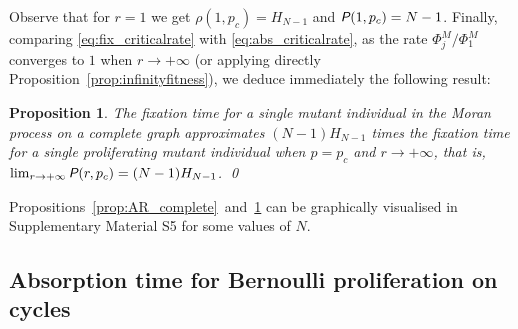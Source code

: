 \documentclass[a4paper,english,10pt]{amsart}
\newcommand{\Rho}{\emph{\textsf{P\hspace{0.1ex}}}}
\newtheorem{proposition}{\bf Proposition}[section]
\theoremstyle{definition}
\numberwithin{equation}{section}
\begin{document}
Observe that for $r=1$ we get  $\rho(1,p_c) = H_{N-1}$ and $\Rho(1,p_c)= N-1$. Finally, comparing \eqref{eq:fix_criticalrate} with \eqref{eq:abs_criticalrate}, as the rate $\Phi^M_j/\Phi^M_1$ converges to $1$ when $r \to +\infty$ (or applying directly Proposition~\ref{prop:infinityfitness}), we deduce immediately the following result:

\begin{proposition}  \label{prop:FR_complete}
The fixation time for a single mutant individual in the Moran process on a complete graph approximates $(N-1)H_{N-1}$ times the fixation time for a single proliferating mutant individual when $p=p_c$ and $r \to +\infty$, that is, 
$\lim_{r \to +\infty} \Rho(r,p_c)  = (N-1)H_{N-1}$. \qed
\end{proposition}

\noindent
Propositions~\ref{prop:AR_complete}~and~\ref{prop:FR_complete} can be graphically visualised in Supplementary Material S5 for some values of $N$.


\subsection{Absorption time for Bernoulli proliferation on cycles}
\end{document}
